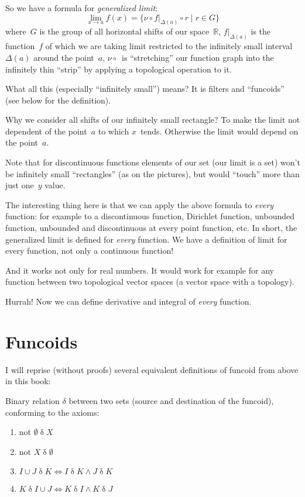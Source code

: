So we have a formula for \emph{generalized limit}:
\[ \lim_{x\to a} f(x) =
\{ \nu \circ f|_{\Delta(a)} \circ r \mid r\in G \} \]
where~$G$ is the group of all horizontal shifts of our space~$\mathbb{R}$, $f|_{\Delta(a)}$ is the function~$f$ of which we are taking limit restricted to the infinitely small interval~$\Delta(a)$ around the point~$a$, $\nu\circ{}$~is ``stretching'' our function graph into the infinitely thin ``strip'' by applying a topological operation to it.

What all this (especially ``infinitely small'') means? It is filters and ``funcoids'' (see below for the definition).

Why we consider all shifts of our infinitely small rectangle? To make the limit not dependent of the point~$a$ to which $x$~tends. Otherwise the limit would depend on the point~$a$.

Note that for discontinuous functions elements of our set (our limit is a set) won't be infinitely small ``rectangles'' (as on the pictures), but would ``touch'' more than just one~$y$ value.

The interesting thing here is that we can apply the above formula to \emph{every} function: for example to a discontinuous function, Dirichlet function, unbounded function, unbounded and discontinuous at every point function, etc. In short, the generalized limit is defined for \emph{every} function. We have a definition of limit for every function, not only a continuous function!

And it works not only for real numbers. It would work for example for any function between two topological vector spaces (a vector space with a topology).

Hurrah! Now we can define derivative and integral of \emph{every} function.

\chapter{Funcoids}

I will reprise (without proofs) several equivalent definitions of funcoid from above in this book:

Binary relation $\delta$ between two sets (source and destination of the funcoid), conforming to the axioms:

\begin{enumerate}
\item not $\emptyset\mathrel{\delta}X$
\item not $X\mathrel{\delta}\emptyset$
\item $I\cup J \mathrel{\delta} K\iff I \mathrel{\delta}K\wedge J\mathrel{\delta}K$
\item $K\mathrel{\delta}I\cup J\iff K \mathrel{\delta}I\wedge K\mathrel{\delta}J$
\end{enumerate}

